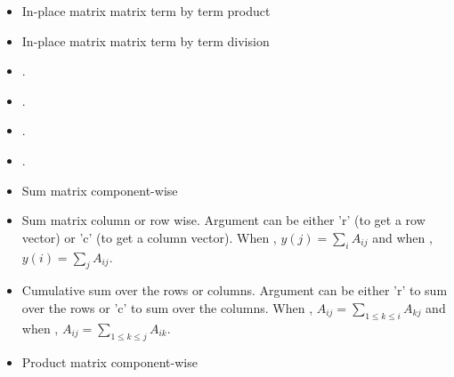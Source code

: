 \begin{itemize}
\item {} 
  \sshortdescribe In-place matrix matrix term by term product  

\item {} 
  \sshortdescribe In-place matrix matrix term by term division

\item {} 
  \sshortdescribe {}.


\item {} 
    \sshortdescribe {}.

  \item {} 
  \sshortdescribe {}.

\item {} 
  \sshortdescribe {}.


\item {}
  \sshortdescribe Sum matrix component-wise  

\item {}
  \sshortdescribe Sum matrix column or row wise. Argument  can be
  either 'r' (to get a row vector) or 'c' (to get a column vector). When
  , $y(j) = \sum_i A_{ij}$ and when , $y(i) = \sum_j
  A_{ij}$.

\item {} 
  \sshortdescribe Cumulative sum over the rows or columns. Argument 
  can be either 'r' to sum over the rows or 'c' to sum over the columns. When
  , $A_{ij} = \sum_{1 \le k \le i} A_{kj}$ and when , 
  $A_{ij} = \sum_{1 \le k \le j} A_{ik}$.

\item {}
  \sshortdescribe Product matrix component-wise


\end{itemize}
